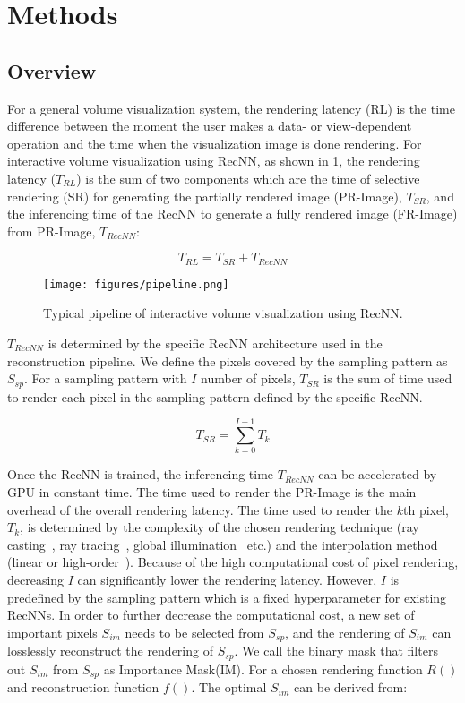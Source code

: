 \section{Methods}
\subsection{Overview}
For a general volume visualization system, the rendering latency (RL) is the time difference between the moment the user makes a data- or view-dependent operation and the time when the visualization image is done rendering. For interactive volume visualization using RecNN, as shown in \cref{fig:pipeline}, the rendering latency ($T_{RL}$) is the sum of two components which are the time of selective rendering (SR) for generating the partially rendered image (PR-Image), $T_{SR}$, and the inferencing time of the RecNN to generate a fully rendered image (FR-Image) from PR-Image, $T_{RecNN}$:

\begin{equation}
T_{RL}=T_{SR} + T_{RecNN}
\end{equation}

\begin{figure}[t]
    \centering 
    \texttt{[image: figures/pipeline.png]}
    \caption{Typical pipeline of interactive volume visualization using RecNN.}
    \label{fig:pipeline}
\end{figure}

$T_{RecNN}$ is determined by the specific RecNN architecture used in the reconstruction pipeline. We define the pixels covered by the sampling pattern as $S_{sp}$. For a sampling pattern with $I$ number of pixels, $T_{SR}$ is the sum of time used to render each pixel in the sampling pattern defined by the specific RecNN. 

\begin{equation}
T_{SR}= \sum_{k = 0}^{I-1}T_{k}
\end{equation}

Once the RecNN is trained, the inferencing time $T_{RecNN}$ can be accelerated by GPU in constant time. The time used to render the PR-Image is the main overhead of the overall rendering latency. The time used to render the $k$th pixel, $T_k$, is determined by the complexity of the chosen rendering technique (ray casting~\cite{795213}, ray tracing~\cite{10.1145/1198555.1198754}, global illumination~\cite{10.1145/2448196.2448205} etc.) and the interpolation method (linear or high-order~\cite{sun2024mfa}). Because of the high computational cost of pixel rendering, decreasing $I$ can significantly lower the rendering latency. However, $I$ is predefined by the sampling pattern which is a fixed hyperparameter for existing RecNNs. In order to further decrease the computational cost, a new set of important pixels $S_{im}$ needs to be selected from $S_{sp}$, and the rendering of $S_{im}$ can losslessly reconstruct the rendering of $S_{sp}$. We call the binary mask that filters out $S_{im}$ from $S_{sp}$ as Importance Mask(IM). For a chosen rendering function $R()$ and reconstruction function $f()$. The optimal $S_{im}$ can be derived from:

